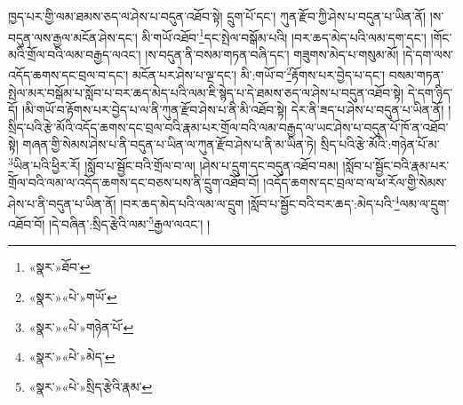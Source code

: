 ཁྱད་པར་གྱི་ལམ་ཐམས་ཅད་ལ་ཤེས་པ་བདུན་འཐོབ་སྟེ། དྲུག་པོ་དང་། ཀུན་རྫོབ་ཀྱི་ཤེས་པ་བདུན་པ་ཡིན་ནོ། །ས་བདུན་ལས་རྒྱལ་མངོན་ཤེས་དང་། མི་གཡོ་འཐོབ་\footnote{«སྣར་»ཐོབ་}དང་སྤེལ་བསྒོམ་པའི། །བར་ཆད་མེད་པའི་ལམ་དག་དང་། །གོང་མའི་གྲོལ་བའི་ལམ་བརྒྱད་ལའང་། །ས་བདུན་ནི་བསམ་གཏན་བཞི་དང་། གཟུགས་མེད་པ་གསུམ་མོ། །དེ་དག་ལས་འདོད་ཆགས་དང་བྲལ་བ་དང་། མངོན་པར་ཤེས་པ་ལྔ་དང་། མི་:གཡོ་བ་\footnote{«སྣར་»«པེ་»གཡོ་}རྟོགས་པར་བྱེད་པ་དང་། བསམ་གཏན་སྤེལ་མར་བསྒོམ་པ་སློབ་པ་བར་ཆད་མེད་པའི་ལམ་ཇི་སྙེད་པ་དེ་ཐམས་ཅད་ལ་ཤེས་པ་བདུན་འཐོབ་སྟེ། དེ་དག་ཉིད་དོ། །མི་གཡོ་བ་རྟོགས་པར་བྱེད་པ་ལ་ནི་ཀུན་རྫོབ་ཤེས་པ་ནི་མི་འཐོབ་སྟེ། དེར་ནི་ཟད་པ་ཤེས་པ་བདུན་པ་ཡིན་ནོ། །སྲིད་པའི་རྩེ་མོའི་འདོད་ཆགས་དང་བྲལ་བའི་རྣམ་པར་གྲོལ་བའི་ལམ་བརྒྱད་ལ་ཡང་ཤེས་པ་བདུན་པོ་ཁོ་ན་འཐོབ་སྟེ། གཞན་གྱི་སེམས་ཤེས་པ་ནི་བདུན་པ་ཡིན་ལ་ཀུན་རྫོབ་ཤེས་པ་ནི་མ་ཡིན་ཏེ། སྲིད་པའི་རྩེ་མོའི་:གཉེན་པོ་མ་\footnote{«སྣར་»«པེ་»གཉེན་པོ་}ཡིན་པའི་ཕྱིར་རོ། །སློབ་པ་སྦྱོང་བའི་གྲོལ་བ་ལ། །ཤེས་པ་དྲུག་དང་བདུན་འཐོབ་བམ། །སློབ་པ་སྦྱོང་བའི་རྣམ་པར་གྲོལ་བའི་ལམ་ལ་འདོད་ཆགས་དང་བཅས་པས་ནི་དྲུག་འཐོབ་བོ། །འདོད་ཆགས་དང་བྲལ་བ་ལ་ཕ་རོལ་གྱི་སེམས་ཤེས་པ་ནི་བདུན་པ་ཡིན་ནོ། །བར་ཆད་མེད་པའི་ལམ་ལ་དྲུག །སློབ་པ་སྦྱོང་བའི་བར་ཆད་:མེད་པའི་\footnote{«སྣར་»«པེ་»མེད་}ལམ་ལ་དྲུག་འཐོབ་བོ། །དེ་བཞིན་:སྲིད་རྩེའི་ལམ་\footnote{«སྣར་»«པེ་»སྲིད་རྩེའི་རྣམ་}རྒྱལ་ལའང་། །
